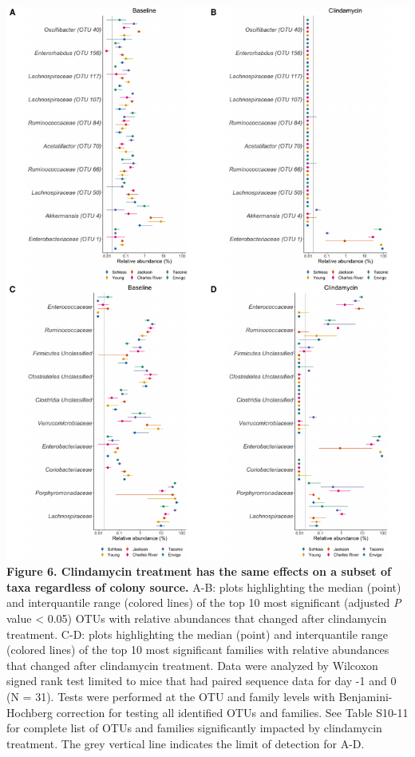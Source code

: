\documentclass[11pt,]{article}
\begin{document}
\includegraphics{figure_6.pdf} \textbf{Figure 6. Clindamycin treatment
has the same effects on a subset of taxa regardless of colony source.}
A-B: plots highlighting the median (point) and interquantile range
(colored lines) of the top 10 most significant (adjusted \emph{P} value
\textless{} 0.05) OTUs with relative abundances that changed after
clindamycin treatment. C-D: plots highlighting the median (point) and
interquantile range (colored lines) of the top 10 most significant
families with relative abundances that changed after clindamycin
treatment. Data were analyzed by Wilcoxon signed rank test limited to
mice that had paired sequence data for day -1 and 0 (N = 31). Tests were
performed at the OTU and family levels with Benjamini-Hochberg
correction for testing all identified OTUs and families. See Table
S10-11 for complete list of OTUs and families significantly impacted by
clindamycin treatment. The grey vertical line indicates the limit of
detection for A-D.
\end{document}
